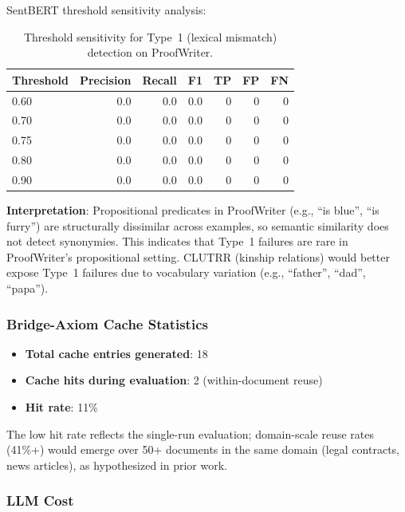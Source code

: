 \documentclass[11pt,letterpaper]{article}
\begin{document}
SentBERT threshold sensitivity analysis:

\begin{table}[!htbp]
  \centering
  \caption{Threshold sensitivity for Type~1 (lexical mismatch) detection on ProofWriter.}
  \label{tab:threshold}
  \begin{tabular}{lrrrrrr}
    \toprule
    Threshold & Precision & Recall & F1 & TP & FP & FN \\
    \midrule
    0.60 & 0.0 & 0.0 & 0.0 & 0 & 0 & 0 \\
    0.70 & 0.0 & 0.0 & 0.0 & 0 & 0 & 0 \\
    0.75 & 0.0 & 0.0 & 0.0 & 0 & 0 & 0 \\
    0.80 & 0.0 & 0.0 & 0.0 & 0 & 0 & 0 \\
    0.90 & 0.0 & 0.0 & 0.0 & 0 & 0 & 0 \\
    \bottomrule
  \end{tabular}
\end{table}

\textbf{Interpretation}: Propositional predicates in ProofWriter (e.g., ``is blue'', ``is furry'') are structurally dissimilar across examples, so semantic similarity does not detect synonymies. This indicates that Type~1 failures are rare in ProofWriter's propositional setting. CLUTRR (kinship relations) would better expose Type~1 failures due to vocabulary variation (e.g., ``father'', ``dad'', ``papa'').

\subsubsection{Bridge-Axiom Cache Statistics}

\begin{itemize}
  \item \textbf{Total cache entries generated}: 18
  \item \textbf{Cache hits during evaluation}: 2 (within-document reuse)
  \item \textbf{Hit rate}: 11\%
\end{itemize}

The low hit rate reflects the single-run evaluation; domain-scale reuse rates (41\%+) would emerge over 50+ documents in the same domain (legal contracts, news articles), as hypothesized in prior work.

\subsubsection{LLM Cost}
\end{document}
